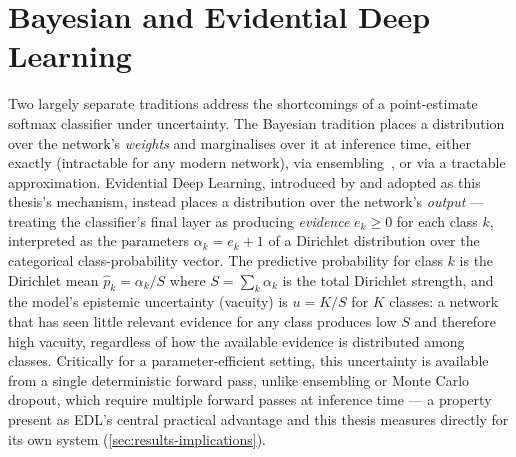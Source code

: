 \documentclass{iutbscthesis}
\begin{document}
\section{Bayesian and Evidential Deep Learning}
\label{sec:related-edl}

Two largely separate traditions address the shortcomings of a point-estimate softmax classifier under uncertainty. The Bayesian tradition places a distribution over the network's \emph{weights} and marginalises over it at inference time, either exactly (intractable for any modern network), via ensembling~\cite{lakshminarayanan2017ensembles}, or via a tractable approximation. Evidential Deep Learning, introduced by \textcite{sensoy2018edl} and adopted as this thesis's mechanism, instead places a distribution over the network's \emph{output} — treating the classifier's final layer as producing \emph{evidence} $e_k \geq 0$ for each class $k$, interpreted as the parameters $\alpha_k = e_k + 1$ of a Dirichlet distribution over the categorical class-probability vector. The predictive probability for class $k$ is the Dirichlet mean $\hat p_k = \alpha_k / S$ where $S = \sum_k \alpha_k$ is the total Dirichlet strength, and the model's epistemic uncertainty (vacuity) is $u = K/S$ for $K$ classes: a network that has seen little relevant evidence for any class produces low $S$ and therefore high vacuity, regardless of how the available evidence is distributed among classes. Critically for a parameter-efficient setting, this uncertainty is available from a single deterministic forward pass, unlike ensembling or Monte Carlo dropout, which require multiple forward passes at inference time — a property \textcite{sensoy2018edl} present as EDL's central practical advantage and this thesis measures directly for its own system (\autoref{sec:results-implications}).
\end{document}

